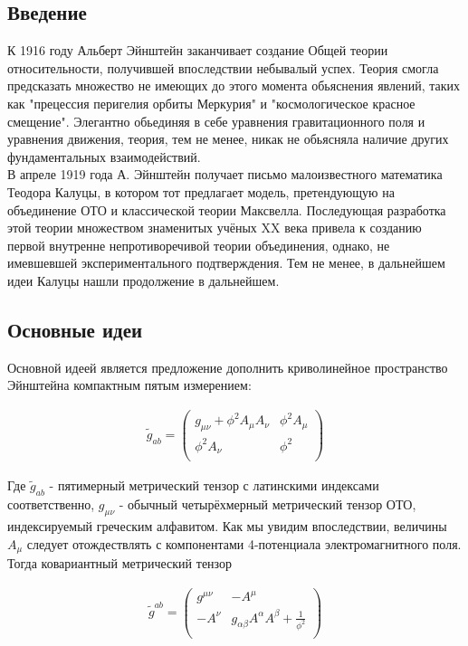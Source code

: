 \documentclass[a4paper,14pt]{article}
\begin{document}
\subsection*{ Введение }

	К 1916 году Альберт Эйнштейн заканчивает создание Общей теории относительности, получившей впоследствии небывалый успех. Теория смогла предсказать множество не имеющих до этого момента обьяснения явлений, таких как "прецессия перигелия орбиты Меркурия" и "космологическое красное смещение". Элегантно обьединяя в себе уравнения гравитационного поля и уравнения движения, теория, тем не менее, никак не обьясняла наличие других фундаментальных взаимодействий. \\
	В апреле 1919 года А. Эйнштейн получает письмо малоизвестного математика Теодора Калуцы, в котором тот предлагает модель, претендующую на объединение ОТО и классической теории Максвелла. Последующая разработка этой теории множеством знаменитых учёных XX века привела к созданию первой внутренне непротиворечивой теории объединения, однако, не имевшевшей экспериментального подтверждения. Тем не менее, в дальнейшем идеи Калуцы нашли продолжение в дальнейшем.

\subsection*{ Основные идеи }

	 Основной идеей является предложение дополнить криволинейное пространство Эйнштейна компактным пятым измерением:

	\begin{align*}
	 	\tilde g_{ab} =
		\left( \begin{array}{cc}
			g_{ \mu \nu } + \phi^2 A_{\mu} A_{\nu} & \phi^2 A_{\mu}    \\
			\phi^2 A_{ \nu }                       & \phi^2            \\
		\end{array} \right)
	\end{align*}

	Где $ \tilde g_{ab} $ - пятимерный метрический тензор с латинскими индексами соответственно, $g_{ \mu \nu }$ - обычный четырёхмерный метрический тензор ОТО, индексируемый греческим алфавитом. Как мы увидим впоследствии, величины $A_{\mu}$ следует отождествлять с компонентами 4-потенциала электромагнитного поля.
	Тогда ковариантный метрический тензор

	\begin{align*}
	 	\tilde g^{ab} =
		\left( \begin{array}{cc}
			g^{ \mu \nu } & - A^{\mu}                                                  \\
			- A^{ \nu }   &  g_{\alpha \beta} A^{\alpha} A^{\beta} + \frac{1}{\phi^2}  \\
		\end{array} \right)
	\end{align*}
\end{document}
